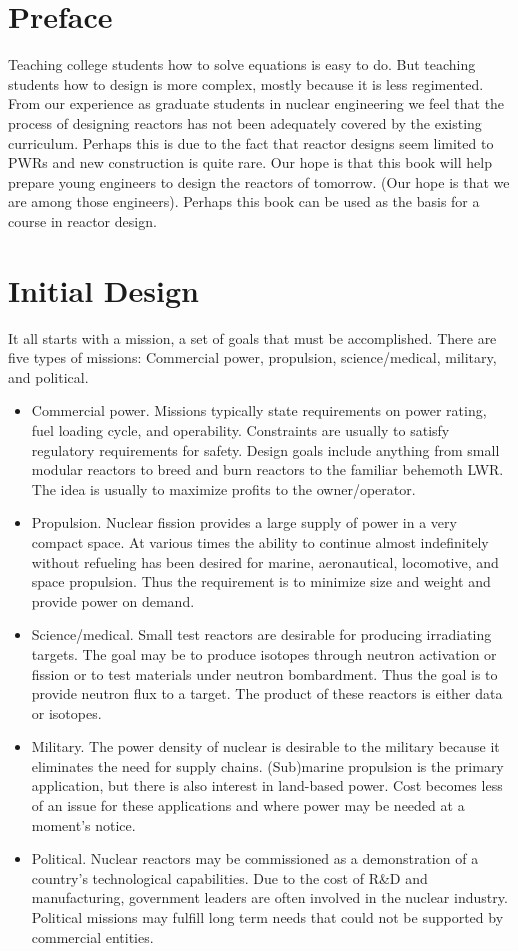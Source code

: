 \documentclass[]{article}
\begin{document}
\section{Preface}
Teaching college students how to solve equations is easy to do. But teaching students how to design is more complex, mostly because it is less regimented. From our experience as graduate students in nuclear engineering we feel that the process of designing reactors has not been adequately covered by the existing curriculum. Perhaps this is due to the fact that reactor designs seem limited to PWRs and new construction is quite rare. Our hope is that this book will help prepare young engineers to design the reactors of tomorrow. (Our hope is that we are among those engineers). Perhaps this book can be used as the basis for a course in reactor design.

\section{Initial Design}
It all starts with a mission, a set of goals that must be accomplished. There are five types of missions: Commercial power, propulsion, science/medical, military, and political.
\begin{itemize}
  \item Commercial power. Missions typically state requirements on power rating, fuel loading cycle, and operability. Constraints are usually to satisfy regulatory requirements for safety. Design goals include anything from small modular reactors to breed and burn reactors to the familiar behemoth LWR. The idea is usually to maximize profits to the owner/operator.
  \item Propulsion. Nuclear fission provides a large supply of power in a very compact space. At various times the ability to continue almost indefinitely without refueling has been desired for marine, aeronautical, locomotive, and space propulsion. Thus the requirement is to minimize size and weight and provide power on demand.
  \item Science/medical. Small test reactors are desirable for producing irradiating targets. The goal may be to produce isotopes through neutron activation or fission or to test materials under neutron bombardment. Thus the goal is to provide neutron flux to a target. The product of these reactors is either data or isotopes. 
  \item Military. The power density of nuclear is desirable to the military because it eliminates the need for supply chains. (Sub)marine propulsion is the primary application, but there is also interest in land-based power. Cost becomes less of an issue for these applications and where power may be needed at a moment's notice.
  \item Political. Nuclear reactors may be commissioned as a demonstration of a country's technological capabilities. Due to the cost of R\&D and manufacturing, government leaders are often involved in the nuclear industry. Political missions may fulfill long term needs that could not be supported by commercial entities.
\end{itemize}
\end{document}
